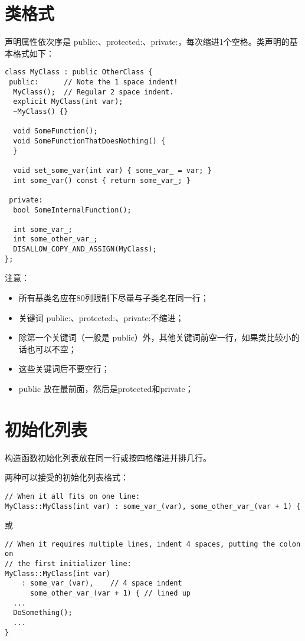 \section{类格式}
声明属性依次序是 public:、protected:、private:，每次缩进1个空格。类声明的基本格式如下：
\begin{verbatim}
class MyClass : public OtherClass {
 public:      // Note the 1 space indent!
  MyClass();  // Regular 2 space indent.
  explicit MyClass(int var);
  ~MyClass() {}

  void SomeFunction();
  void SomeFunctionThatDoesNothing() {
  }

  void set_some_var(int var) { some_var_ = var; }
  int some_var() const { return some_var_; }

 private:
  bool SomeInternalFunction();

  int some_var_;
  int some_other_var_;
  DISALLOW_COPY_AND_ASSIGN(MyClass);
};
\end{verbatim}

注意：
\begin{itemize}
  \item 所有基类名应在80列限制下尽量与子类名在同一行；
  \item 关键词 public:、protected:、private:不缩进；
  \item 除第一个关键词（一般是 public）外，其他关键词前空一行，如果类比较小的话也可以不空；
  \item 这些关键词后不要空行；
  \item public 放在最前面，然后是protected和private；
\end{itemize}


\section{初始化列表}
构造函数初始化列表放在同一行或按四格缩进并排几行。

两种可以接受的初始化列表格式：
\begin{verbatim}
// When it all fits on one line:
MyClass::MyClass(int var) : some_var_(var), some_other_var_(var + 1) {
\end{verbatim}
或
\begin{verbatim}
// When it requires multiple lines, indent 4 spaces, putting the colon on
// the first initializer line:
MyClass::MyClass(int var)
    : some_var_(var),    // 4 space indent
      some_other_var_(var + 1) { // lined up
  ...
  DoSomething();
  ...
}
\end{verbatim}


